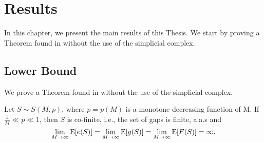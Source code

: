 \chapter{Results}\label{chap:results}

In this chapter, we present the main results of this Thesis. We start by proving a Theorem found in \cite{de2018random} without the use of the simplicial complex. 

\section{Lower Bound}\label{sec:results:lowerbound}

We prove a Theorem found in \cite{de2018random} without the use of the simplicial complex. 

\begin{theorem}\label{thm:lowerbound}
    Let $S \sim S(M, p)$, where $p = p(M)$ is a monotone decreasing function of M. If $\frac{1}{M} \ll p \ll 1$, then $S$ is co-finite, i.e., the set of gaps is finite, a.a.s and 
\[\lim_{M \to \infty} \mathrm{E}[e(S)] = \lim_{M \to \infty} \mathrm{E}[g(S)] = \lim_{M \to \infty} \mathrm{E}[F(S)] = \infty.\]
\end{theorem}

